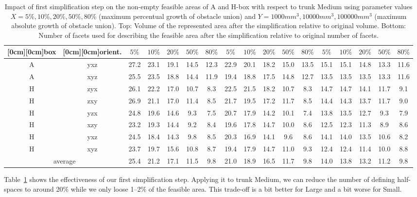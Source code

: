 \documentclass{article}
\newcommand{\TSmall}{{\sc Small}}
\newcommand{\TMedium}{{\sc Medium}}
\newcommand{\TLarge}{{\sc Large}}
\begin{document}
\begin{table}[t]
\begin{tabular}{|cc|ccccc|ccccc|ccccc|}
\raisebox{1.4ex}[0cm][0cm]{box} &
\raisebox{1.4ex}[0cm][0cm]{orient.} & 
$5\%$ & $10\%$ & $20\%$ & $50\%$ & $80\%$ & $5\%$ & $10\%$ & $20\%$ & $50\%$ & $80\%$
& $5\%$ & $10\%$ & $20\%$ & $50\%$ & $80\%$ \\
\hline
A & yxz & 27.2 & 23.1 & 19.1 & 14.5 & 12.3 & 22.9 & 20.1 & 18.2 & 15.0 & 13.5 & 15.1 & 15.1 & 14.8 & 13.3 & 11.6 \\
A & xyz & 25.5 & 23.5 & 18.8 & 14.4 & 11.9 & 19.4 & 18.8 & 17.5 & 14.8 & 12.7 & 13.5 & 13.5 & 13.5 & 13.3 & 11.6 \\
H & zyx & 26.1 & 22.2 & 17.0 & 10.7 & 8.3 & 22.5 & 21.5 & 18.2 & 10.7 & 8.3 & 14.7 & 14.7 & 14.1 & 11.7 & 9.1 \\
H & zxy & 26.9 & 21.1 & 17.0 & 11.4 & 8.5 & 21.7 & 19.5 & 17.2 & 11.7 & 8.5 & 14.4 & 14.3 & 13.7 & 11.7 & 9.0 \\
H & yzx & 24.8 & 19.6 & 14.6 & 9.3 & 7.5 & 20.7 & 17.9 & 14.2 & 10.1 & 7.4 & 13.8 & 13.5 & 12.7 & 9.3 & 7.9 \\
H & xzy & 23.2 & 19.3 & 14.4 & 9.2 & 8.4 & 19.6 & 17.8 & 14.7 & 10.0 & 8.6 & 12.5 & 12.3 & 11.3 & 8.9 & 8.6 \\
H & yxz & 24.5 & 18.4 & 14.3 & 9.8 & 8.5 & 20.3 & 16.9 & 14.1 & 9.6 & 8.6 & 14.1 & 14.0 & 13.5 & 10.6 & 8.2 \\
H & xyz & 23.7 & 19.7 & 15.6 & 10.8 & 8.7 & 19.4 & 17.9 & 14.7 & 11.0 & 9.3 & 12.4 & 12.4 & 11.4 & 10.0 & 8.8 \\
\hline
\multicolumn{2}{|c|}{average} 
& 25.4 & 21.2 & 17.1 & 11.5 &  9.8
& 21.0 & 18.9 & 16.5 & 11.7 &  9.8
& 14.0 & 13.8 & 13.2 & 11.2 &  9.8 \\
\hline
\end{tabular}

\caption{Impact of first simplification step on the non-empty feasible
  areas of A and H-box with respect to trunk {\TMedium} using
  parameter values $X=5\%,10\%, 20\%, 50\%, 80\%$ (maximum percentual
  growth of obstacle union) and $Y=1000 mm^3, 10000 mm^3, 100000 mm^3$
  (maximum absolute growth of obstacle union). Top: Volume of the
  represented area after the simplification relative to original
  volume.  Bottom: Number of facets used for describing the feasible
  area after the simplification relative to original number of
  facets.}

\label{table:simplificationDetailed}
\end{table}

Table~\ref{table:simplificationDetailed} shows the effectiveness of
our first simplification step. Applying it to trunk {\TMedium}, we can
reduce the number of defining half-spaces to around 20\% while we only
loose 1--2\% of the feasible area. This trade-off is a bit better for
{\TLarge} and a bit worse for {\TSmall}.
\end{document}
